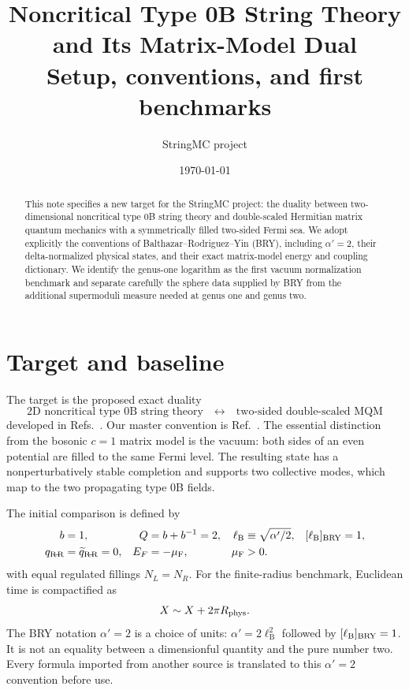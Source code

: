 \documentclass[11pt]{article}
\title{Noncritical Type 0B String Theory\\
and Its Matrix-Model Dual\\[0.4em]
\large Setup, conventions, and first benchmarks}
\author{StringMC project}
\date{\today}
\newcommand{\ap}{\alpha'}
\newcommand{\RR}{\mathrm{R\!\!-\!\!R}}
\newcommand{\ellB}{\ell_{\mathrm B}}
\begin{document}
\maketitle

\begin{abstract}
This note specifies a new target for the StringMC project: the duality between
two-dimensional noncritical type 0B string theory and double-scaled Hermitian
matrix quantum mechanics with a symmetrically filled two-sided Fermi sea.  We
adopt explicitly the conventions of Balthazar--Rodriguez--Yin (BRY),
including $\ap=2$, their delta-normalized physical states, and their exact
matrix-model energy and coupling dictionary.  We identify the genus-one
logarithm as the first vacuum normalization benchmark and separate carefully
the sphere data supplied by BRY from the additional supermoduli measure
needed at genus one and genus two.
\end{abstract}

\tableofcontents

\section{Target and baseline}

The target is the proposed exact duality
\begin{equation}
 \boxed{
 \text{2D noncritical type 0B string theory}
 \quad\longleftrightarrow\quad
 \text{two-sided double-scaled MQM}}
 \label{eq:duality}
\end{equation}
developed in Refs.~\cite{DouglasEtAl2003NewHat,TakayanagiToumbas2003Type0B}.
Our master convention is Ref.~\cite{BalthazarRodriguezYin2023SMatrix}.
The essential distinction from the bosonic $c=1$ matrix model is the vacuum:
both sides of an even potential are filled to the same Fermi level.  The
resulting state has a nonperturbatively stable completion and supports two
collective modes, which map to the two propagating type 0B fields.

The initial comparison is defined by
\begin{equation}
 \begin{aligned}
 b&=1,
 &Q&=b+b^{-1}=2,
 &\ellB&\equiv\sqrt{\ap/2},
 &[\ellB]_{\rm BRY}&=1,\\
 q_{\RR}&=\widetilde q_{\RR}=0,
 &E_F&=-\mu_{\rm F},
 &\mu_{\rm F}&>0.
 \end{aligned}
 \label{eq:baseline}
\end{equation}
with equal regulated fillings $N_L=N_R$.  For the finite-radius benchmark,
Euclidean time is compactified as
\begin{equation}
 X\sim X+2\pi R_{\rm phys}.
 \label{eq:circle}
\end{equation}
The BRY notation $\ap=2$ is a choice of units:
$\ap=2\ellB^2$ followed by $[\ellB]_{\rm BRY}=1$.  It is not an equality
between a dimensionful quantity and the pure number two.
Every formula imported from another source is translated to this
$\ap=2$ convention before use.
\end{document}
